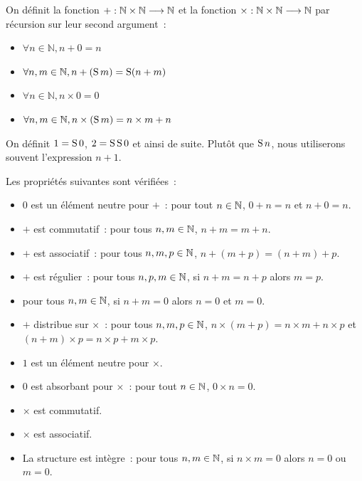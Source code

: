 \begin{definition}
  On définit la fonction $+ : \displaystyle \mathbb N \times \mathbb N \longrightarrow \mathbb N$ et la
  fonction $\times : \displaystyle \mathbb N \times \mathbb N \longrightarrow \mathbb N$ par récursion
  sur leur second argument~:
  \begin{itemize}
  \item $\forall n \in \mathbb N, n + 0 = n$
  \item $\forall n,m\in \mathbb N, n + (\operatorname{S} m) = \operatorname{S}(n + m)$
  \item $\forall n \in \mathbb N, n \times 0 = 0$
  \item $\forall n,m\in\mathbb N, n \times (\operatorname{S} m) = n\times m + n$
  \end{itemize}
\end{definition}

\begin{notation}
  On définit $1 = \operatorname{S} 0$, $2 = \operatorname{S}\operatorname{S} 0$ et ainsi de suite. Plutôt que $\operatorname{S} n$,
  nous utiliserons souvent l'expression $n + 1$.
\end{notation}

\begin{property}
  Les propriétés suivantes sont vérifiées~:
  \begin{itemize}
  \item $0$ est un élément neutre pour $+$~: pour tout $n\in \mathbb N$,
    $0 + n = n$ et $n + 0 = n$.
  \item $+$ est commutatif~: pour tous $n,m\in\mathbb N$, $n+m=m+n$.
  \item $+$ est associatif~: pour tous $n,m,p\in\mathbb N$,
    $n+(m+p) = (n+m)+p$.
  \item $+$ est régulier~: pour tous $n,p,m\in\mathbb N$, si $n+m = n+p$ alors
    $m=p$.
  \item pour tous $n,m\in \mathbb N$, si $n + m = 0$ alors $n=0$ et $m = 0$.
  \item $+$ distribue sur $\times$~: pour tous $n,m,p\in\mathbb N$,
    $n\times(m+p) = n\times m + n \times p$ et
    $(n+m)\times p = n\times p + m \times p$.
  \item $1$ est un élément neutre pour $\times$.
  \item $0$ est absorbant pour $\times$~: pour tout $n\in \mathbb N$,
    $0\times n = 0$.
  \item $\times$ est commutatif.
  \item $\times$ est associatif.
  \item La structure est intègre~: pour tous $n,m\in \mathbb N$, si
    $n\times m = 0$ alors $n = 0$ ou $m = 0$.
  \end{itemize}
\end{property}

